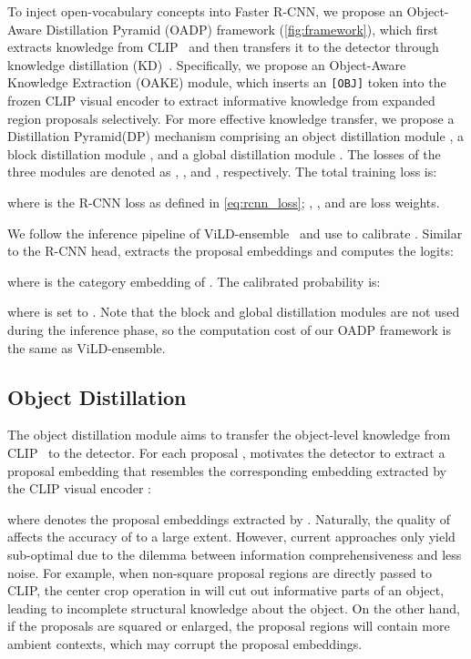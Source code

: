 \documentclass[10pt,twocolumn,letterpaper]{article}
\def\OADP{Object-Aware Distillation Pyramid}
\def\OAKE{Object-Aware Knowledge Extraction}
\def\DP{Distillation Pyramid}
\begin{document}
To inject open-vocabulary concepts into Faster R-CNN, we propose an \OADP{} (OADP) framework (\cref{fig:framework}), which first extracts knowledge from CLIP~\cite{clip} and then transfers it to the detector through knowledge distillation (KD)~\cite{kd}.
Specifically, we propose an \OAKE{} (OAKE) module, which inserts an \texttt{[OBJ]} token into the frozen CLIP visual encoder  to extract informative knowledge from expanded region proposals selectively.
For more effective knowledge transfer, we propose a \DP (DP) mechanism comprising an object distillation module , a block distillation module , and a global distillation module .
The losses of the three modules are denoted as , , and , respectively.
The total training loss is:

where  is the R-CNN loss as defined in \cref{eq:rcnn_loss}; , , and  are loss weights.

We follow the inference pipeline of ViLD-ensemble~\cite{vild} and use  to calibrate .
Similar to the R-CNN head,  extracts the proposal embeddings  and computes the logits:

where  is the category embedding of .
The calibrated probability  is:

where  is set to .
Note that the block and global distillation modules are not used during the inference phase, so the computation cost of our OADP framework is the same as ViLD-ensemble.
 
\subsection{Object Distillation}
\label{sec:object_distillation}

The object distillation module  aims to transfer the object-level knowledge from CLIP~\cite{clip} to the detector.
For each proposal ,  motivates the detector to extract a proposal embedding  that resembles the corresponding embedding  extracted by the CLIP visual encoder :

where  denotes the proposal embeddings extracted by .
Naturally, the quality of  affects the accuracy of  to a large extent.
However, current approaches only yield sub-optimal  due to the dilemma between information comprehensiveness and less noise.
For example, when non-square proposal regions are directly passed to CLIP, the center crop operation in  will cut out informative parts of an object, leading to incomplete structural knowledge about the object.
On the other hand, if the proposals are squared or enlarged, the proposal regions will contain more ambient contexts, which may corrupt the proposal embeddings.
\end{document}
